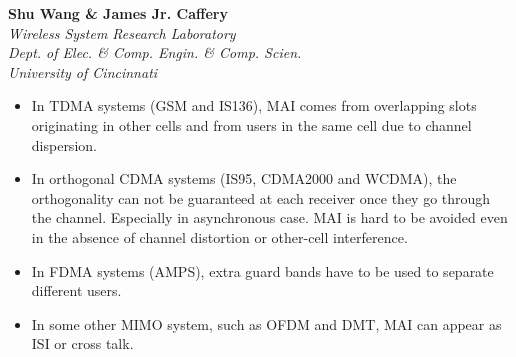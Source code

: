 \documentclass[20pt,landscape]{foils}
\begin{document}
\raggedright \color{black}
\pagecolor{bgcolor} %



\begin{center}
\vspace{.3in}
{\bf Shu Wang \& James Jr. Caffery}  \\
{\it \vspace{0.9in} Wireless System Research Laboratory \\
\vspace{0.2in} Dept. of Elec. \& Comp. Engin. \& Comp. Scien.
\\ University of Cincinnati}
\end{center}

\foilhead{} \vspace{2.0in}



\begin{itemize}
\item In TDMA systems (GSM and IS136), MAI comes from overlapping
slots originating in other cells and from users in the same cell
due to channel dispersion.

\item In orthogonal CDMA systems (IS95, CDMA2000 and WCDMA), the
orthogonality can not be guaranteed at each receiver once they go
through the channel. Especially in asynchronous case. MAI is hard
to be avoided even in the absence of channel distortion or
other-cell interference.

\item In FDMA systems (AMPS), extra guard bands have to be used to
separate different users.

\item In some other MIMO system, such as OFDM and DMT, MAI can
appear as ISI or cross talk.
\end{itemize}
\end{document}

